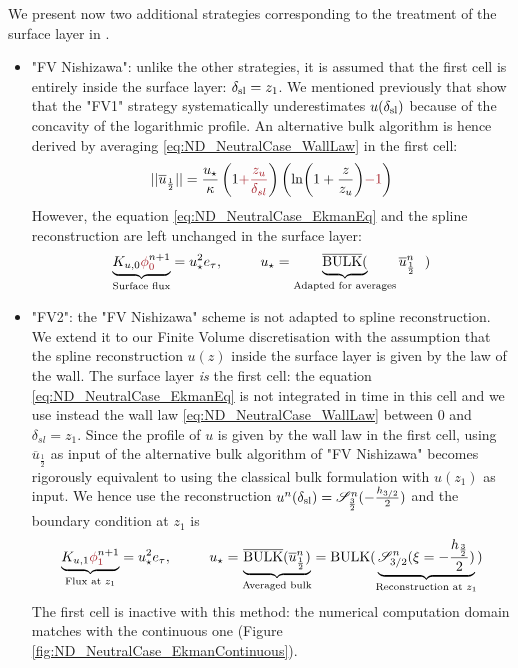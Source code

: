 We present now two additional strategies corresponding to
the treatment of the surface layer in \citep{nishizawa_surface_2018}.
\begin{itemize}
    \item "FV Nishizawa":  unlike the other strategies,
	    it is assumed that the first cell is entirely inside
		the surface layer: $\delta_{\rm sl} = z_{1}$.
		We mentioned previously that
		\cite{nishizawa_surface_2018} show that the "FV1"
		strategy systematically underestimates
		$u(\delta_{\rm sl})$ because of the
	  concavity of the logarithmic profile.
	  An alternative bulk algorithm is hence derived by averaging
		\eqref{eq:ND_NeutralCase_WallLaw} in the first cell:
	\begin{equation}
		||\overline{u}_{\frac{1}{2}}||
		= \frac{u_\star}{\kappa}
		\left(1\emphase{+\frac{z_u}{\delta_{sl}}}\right)
		\left(\ln(1+\frac{z}{z_u})\emphase{-1}\right)
	\end{equation}
	However, the equation \eqref{eq:ND_NeutralCase_EkmanEq}
	and the spline reconstruction are left unchanged in the
	surface layer:
		  \begin{equation}
		\underbrace{K_{u,0} \emphase{\phi}^{n+1}_\emphase{0}}_{\text{Surface flux}}
		= u_\star^2 e_\tau, ~~~~~~~~
			  u_\star = \underbrace{\overline{{\rm BULK}}(}_{
				  \text{Adapted for averages}}
			  \overline{u}^{n}_{\frac{1}{2}}~~)
		  \end{equation}
	\item "FV2": the "FV Nishizawa" scheme is not adapted to
		spline reconstruction. We extend it to our
		Finite Volume discretisation with the assumption
		that the spline reconstruction $u(z)$ inside
		the surface layer is given by the law of the wall.
	    The surface layer \textit{is} the first cell:
	    the equation \eqref{eq:ND_NeutralCase_EkmanEq}
	    is not integrated in time in this cell
	and we use instead the wall law
	\eqref{eq:ND_NeutralCase_WallLaw} between 0 and
		$\delta_{sl} = z_1$.
	Since the profile of $u$ is given by the wall law
	in the first cell,
	using $\overline{u}_{\frac{1}{2}}$ as input of
	the alternative bulk algorithm of "FV Nishizawa"
	becomes rigorously equivalent to using the
	classical bulk formulation with $u(z_1)$
	as input.
	We hence use the reconstruction
	$u^n(\delta_{\rm sl}) = {\cal S}^n_{\frac{3}{2}}(
	  -\frac{h_{3/2}}{2})$ and the boundary condition
		  at $z_1$ is
	  \begin{equation}
		\underbrace{K_{u,1} \emphase{\phi}^{n+1}_\emphase{1}}_{\text{Flux at } z_1}
		= u_\star^2 e_\tau, ~~~~~~~~
			  u_\star = \underbrace{\overline{{\rm BULK}}(
			  \overline{u}^{n}_{\frac{1}{2}})}_{
				  \text{Averaged bulk}
			  } = {\rm BULK}(
			\underbrace{{\cal S}_{3/2}^{n}
			(\xi=-\frac{h_{\frac{3}{2}}}{2})}_{
				\text{Reconstruction at }
			z_{1}})
		  \end{equation}
	The first cell is inactive with this method:
	the numerical computation domain matches with the continuous
	one (Figure \ref{fig:ND_NeutralCase_EkmanContinuous}).
  \end{itemize}
